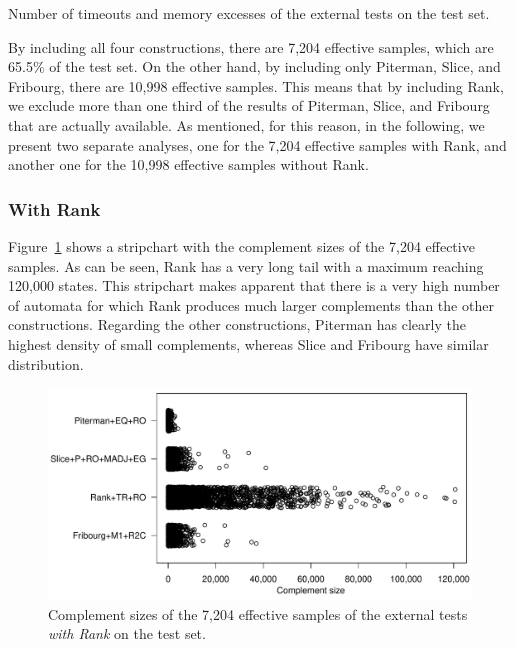 \begin{table}[ht]
\centering

\caption{Number of timeouts and memory excesses of the external tests on the \goal{} test set.}
\label{e.g.outs}
\end{table}

By including all four constructions, there are 7,204 effective samples, which are 65.5\% of the test set. On the other hand, by including only Piterman, Slice, and Fribourg, there are 10,998 effective samples. This means that by including Rank, we exclude more than one third of the results of Piterman, Slice, and Fribourg that are actually available. As mentioned, for this reason, in the following, we present two separate analyses, one for the 7,204 effective samples with Rank, and another one for the 10,998 effective samples without Rank.

\subsubsection{With Rank}
Figure~\ref{e.g.stripchart.with_rank} shows a stripchart with the complement sizes of the 7,204 effective samples. As can be seen, Rank has a very long tail with a maximum reaching 120,000 states. This stripchart makes apparent that there is a very high number of automata for which Rank produces much larger complements than the other constructions. Regarding the other constructions, Piterman has clearly the highest density of small complements, whereas Slice and Fribourg have similar distribution.

\begin{figure}[htb]
\centering
\includegraphics[scale=0.575]{../results/figures/external/goal/s.stripchart.with_rank.pdf}
\caption{Complement sizes of the 7,204 effective samples of the external tests \textit{with Rank} on the \goal{} test set.}
\label{e.g.stripchart.with_rank}
\end{figure}


